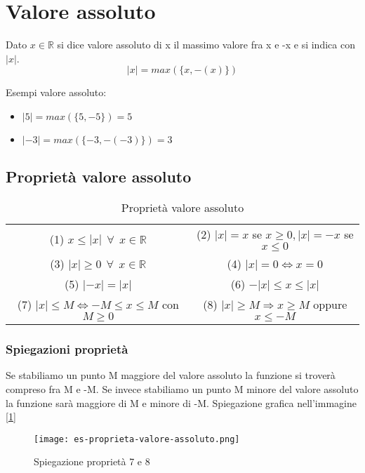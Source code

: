 \newpage
\section{Valore assoluto}
\begin{definition}
    Dato $x \in \mathbb{R}$ si dice valore assoluto di x il massimo valore fra x e -x e si indica con $|x|$.
    \begin{equation}
        |x| = max(\{x, -(x)\})
    \end{equation}
\end{definition}
\begin{example}
    Esempi valore assoluto:
    \begin{itemize}
        \item $|5| = max(\{5, -5\}) = 5$
        \item $|-3| = max(\{-3, -(-3)\}) = 3$
    \end{itemize}
\end{example}
\subsection{Proprietà valore assoluto}
\begin{table}[h!]
    \setlength{\tabcolsep}{7pt}
    \renewcommand{\arraystretch}{2}
    \centering
    \begin{tabular}{|c|c|}
        \hline
        (1) $x \leq |x| \: \: \forall \: \: x \in \mathbb{R}$ & (2) $|x| = x$ se $x \geq 0, |x| = -x$ se $x \leq 0$ \\
        (3) $|x| \geq 0 \: \: \forall \: \: x \in \mathbb{R}$ & (4) $|x| = 0 \Longleftrightarrow x = 0$ \\
        (5) $|-x| = |x|$ & (6) $-|x| \leq x \leq |x|$ \\
        (7) $|x| \leq M \Longleftrightarrow -M \leq x \leq M$ con $M \geq 0$ & (8) $|x| \geq M \Longrightarrow x \geq M$ oppure $x \leq -M$ \\ \hline
    \end{tabular}
    \caption{Proprietà valore assoluto}
    \label{tab:prop-valore-assoluto}
\end{table}
\subsubsection{Spiegazioni proprietà}
Se stabiliamo un punto M maggiore del valore assoluto la funzione si troverà compreso fra M e -M. Se invece stabiliamo un punto M minore del valore assoluto la funzione sarà maggiore di M e minore di -M. Spiegazione grafica nell'immagine [\ref{fig:prop-6-7}]
\begin{figure}[h!]
    \centering
    \texttt{[image: es-proprieta-valore-assoluto.png]}
    \caption{Spiegazione proprietà 7 e 8}
    \label{fig:prop-6-7}
\end{figure}

